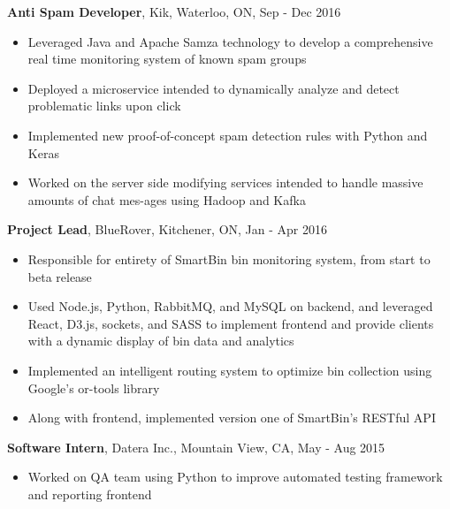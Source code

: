\documentclass[letterpaper,11pt]{article}
\newcommand{\itemheader}[1]{\hspace*{7pt}\textbf{#1}}
\newcommand{\indentitem}{\setlength\itemindent{25pt}}
\begin{document}
      \vspace{7pt}
      \itemheader{Anti Spam Developer}, Kik, Waterloo, ON, Sep - Dec 2016
        \begin{itemize}
          \indentitem
          	\item Leveraged Java and Apache Samza technology to develop a comprehensive real time monitoring \hspace*{25pt}system of known spam groups
            \item Deployed a microservice intended to dynamically analyze and detect problematic links upon click
            \item Implemented new proof-of-concept spam detection rules with Python and Keras
            \item Worked on the server side modifying services intended to handle massive amounts of chat mes-\hspace*{25pt}ages using Hadoop and Kafka
        \end{itemize}
        
      \vspace{7pt}
      \itemheader{Project Lead}, BlueRover, Kitchener, ON, Jan - Apr 2016
        \begin{itemize}
          \indentitem
            \item Responsible for entirety of SmartBin bin monitoring system, from start to beta release
            \item Used Node.js, Python, RabbitMQ, and MySQL on backend, and leveraged React, D3.js, sockets, \hspace*{25pt}and SASS to implement frontend and provide clients with a dynamic display of bin data and analytics
            \item Implemented an intelligent routing system to optimize bin collection using Google's or-tools library
            \item Along with frontend, implemented version one of SmartBin's RESTful API
        \end{itemize}

      \vspace{7pt}
      \itemheader{Software Intern}, Datera Inc., Mountain View, CA, May - Aug 2015
        \begin{itemize}
          \indentitem
            \item Worked on QA team using Python to improve automated testing framework and reporting frontend
        \end{itemize}
\end{document}
